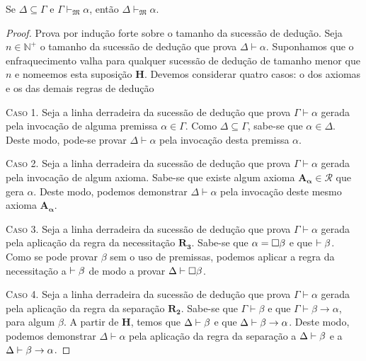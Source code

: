     \vspace{.5\baselineskip}
    \begin{tcolorbox}[enhanced jigsaw, breakable, sharp corners, colframe=black, colback=white, boxrule=0.5pt, left=1.5mm, right=1.5mm, top=1.5mm, bottom=1.5mm]
    \begin{theorem}[Enfraquecimento]\label{weakening}
        Se $\Delta\subseteq\Gamma$ e $\Gamma\vdash_{\mathfrak{M}}\alpha$, então $\Delta\vdash_{\mathfrak{M}}\alpha$.
        \begin{proof}
            Prova por indução forte sobre o tamanho da sucessão de dedução.
            Seja $n\in\mathbb{N}^+$ o tamanho da sucessão de dedução que prova $\Delta\vdash\alpha$.
            Suponhamos que o enfraquecimento valha para qualquer sucessão de dedução de tamanho menor que $n$ e nomeemos esta suposição $\mathbf{H}$.
            Devemos considerar quatro casos: o dos axiomas e os das demais regras de dedução

            \vspace{0.5\baselineskip}
            \textsc{Caso 1.}
            Seja a linha derradeira da sucessão de dedução que prova $\Gamma\vdash\alpha$ gerada pela invocação de alguma premissa $\alpha\in\Gamma$.
            Como $\Delta\subseteq\Gamma$, sabe-se que $\alpha\in\Delta$.
            Deste modo, pode-se provar $\Delta\vdash\alpha$ pela invocação desta premissa $\alpha$.

            \vspace{.5\baselineskip}
            \textsc{Caso 2.}
            Seja a linha derradeira da sucessão de dedução que prova $\Gamma\vdash\alpha$ gerada pela invocação de algum axioma.
            Sabe-se que existe algum axioma $\mathbf{A_\alpha}\in\mathcal{R}$ que gera $\alpha$.
            Deste modo, podemos demonstrar $\Delta\vdash\alpha$ pela invocação deste mesmo axioma $\mathbf{A_\alpha}$.

            \vspace{.5\baselineskip}
            \textsc{Caso 3.}
            Seja a linha derradeira da sucessão de dedução que prova $\Gamma\vdash\alpha$ gerada pela aplicação da regra da necessitação \hyperref[modal.rule.3]{$\mathbf{R_3}$}.
            Sabe-se que $\alpha=\Box\beta$ e que ${\mathrel{\vdash}\beta}$.
            Como se pode provar $\beta$ sem o uso de premissas, podemos aplicar a regra da necessitação a ${\mathrel{\vdash}\beta}$ de modo a provar ${\Delta\mathrel{\vdash}\Box\beta}$.

            \vspace{.5\baselineskip}
            \textsc{Caso 4.}
            Seja a linha derradeira da sucessão de dedução que prova $\Gamma\vdash\alpha$ gerada pela aplicação da regra da separação \hyperref[modal.rule.2]{$\mathbf{R_2}$}.
            Sabe-se que $\Gamma\vdash\beta$ e que $\Gamma\vdash\beta\to\alpha$, para algum $\beta$.
            A partir de $\mathbf{H}$, temos que $\Delta\mathrel{\vdash}\beta$ e que $\Delta\mathrel{\vdash}\beta\to\alpha$.
            Deste modo, podemos demonstrar $\Delta\vdash\alpha$ pela aplicação da regra da separação a $\Delta\mathrel{\vdash}\beta$ e a $\Delta\mathrel{\vdash}\beta\to\alpha$.


\end{proof}
\end{theorem}
\end{tcolorbox}
